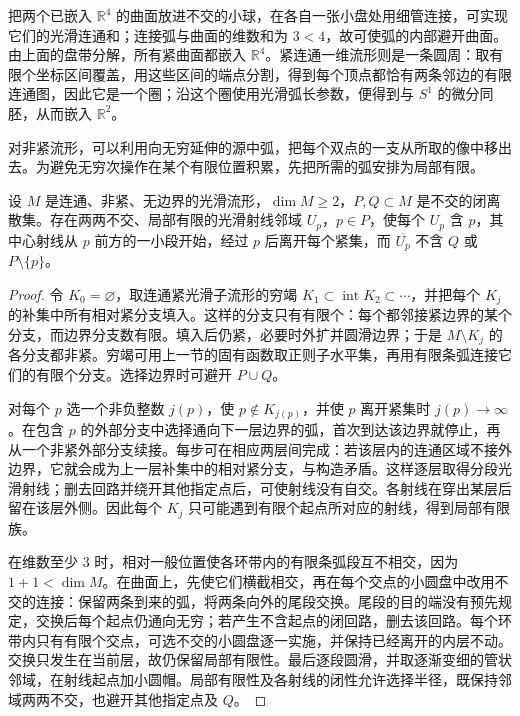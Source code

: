 把两个已嵌入 \(\mathbb R^4\) 的曲面放进不交的小球，在各自一张小盘处用细管连接，可实现它们的光滑连通和；连接弧与曲面的维数和为 \(3<4\)，故可使弧的内部避开曲面。由上面的盘带分解，所有紧曲面都嵌入 \(\mathbb R^4\)。紧连通一维流形则是一条圆周：取有限个坐标区间覆盖，用这些区间的端点分割，得到每个顶点都恰有两条邻边的有限连通图，因此它是一个圈；沿这个圈使用光滑弧长参数，便得到与 \(S^1\) 的微分同胚，从而嵌入 \(\mathbb R^2\)。

\ProseParagraphBreak

对非紧流形，可以利用向无穷延伸的源中弧，把每个双点的一支从所取的像中移出去。为避免无穷次操作在某个有限位置积累，先把所需的弧安排为局部有限。

\begin{lemma}\label{g2:lem:locally-finite-rays}
	设 \(M\) 是连通、非紧、无边界的光滑流形，\(\dim M\ge2\)，\(P,Q\subset M\) 是不交的闭离散集。存在两两不交、局部有限的光滑射线邻域 \(U_p\)，\(p\in P\)，使每个 \(U_p\) 含 \(p\)，其中心射线从 \(p\) 前方的一小段开始，经过 \(p\) 后离开每个紧集，而 \(\overline{U_p}\) 不含 \(Q\) 或 \(P\setminus\{p\}\)。
\end{lemma}
\begin{proof}
	令 \(K_0=\varnothing\)，取连通紧光滑子流形的穷竭 \(K_1\subset\operatorname{int}K_2\subset\cdots\)，并把每个 \(K_j\) 的补集中所有相对紧分支填入。这样的分支只有有限个：每个都邻接紧边界的某个分支，而边界分支数有限。填入后仍紧，必要时外扩并圆滑边界；于是 \(M\setminus K_j\) 的各分支都非紧。穷竭可用上一节的固有函数取正则子水平集，再用有限条弧连接它们的有限个分支。选择边界时可避开 \(P\cup Q\)。

	对每个 \(p\) 选一个非负整数 \(j(p)\)，使 \(p\notin K_{j(p)}\)，并使 \(p\) 离开紧集时 \(j(p)\to\infty\)。在包含 \(p\) 的外部分支中选择通向下一层边界的弧，首次到达该边界就停止，再从一个非紧外部分支续接。每步可在相应两层间完成：若该层内的连通区域不接外边界，它就会成为上一层补集中的相对紧分支，与构造矛盾。这样逐层取得分段光滑射线；删去回路并绕开其他指定点后，可使射线没有自交。各射线在穿出某层后留在该层外侧。因此每个 \(K_j\) 只可能遇到有限个起点所对应的射线，得到局部有限族。

	在维数至少 \(3\) 时，相对一般位置使各环带内的有限条弧段互不相交，因为 \(1+1<\dim M\)。在曲面上，先使它们横截相交，再在每个交点的小圆盘中改用不交的连接：保留两条到来的弧，将两条向外的尾段交换。尾段的目的端没有预先规定，交换后每个起点仍通向无穷；若产生不含起点的闭回路，删去该回路。每个环带内只有有限个交点，可选不交的小圆盘逐一实施，并保持已经离开的内层不动。交换只发生在当前层，故仍保留局部有限性。最后逐段圆滑，并取逐渐变细的管状邻域，在射线起点加小圆帽。局部有限性及各射线的闭性允许选择半径，既保持邻域两两不交，也避开其他指定点及 \(Q\)。
\end{proof}

